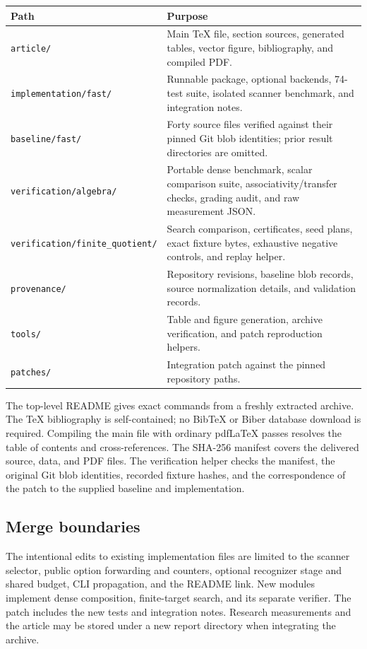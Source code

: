 \begin{center}
\small
\begin{tabular}{P{.35\linewidth}P{.57\linewidth}}
\toprule
Path & Purpose \\
\midrule
\texttt{article/} & Main TeX file, section sources, generated tables,
vector figure, bibliography, and compiled PDF. \\
\texttt{implementation/fast/} & Runnable package, optional backends,
74-test suite, isolated scanner benchmark, and integration notes. \\
\texttt{baseline/fast/} & Forty source files verified against their
pinned Git blob identities; prior result directories are omitted. \\
\texttt{verification/algebra/} & Portable dense benchmark, scalar
comparison suite, associativity/transfer checks, grading audit, and raw
measurement JSON. \\
\texttt{verification/finite\_quotient/} & Search comparison, certificates,
seed plans, exact fixture bytes, exhaustive negative controls, and replay
helper. \\
\texttt{provenance/} & Repository revisions, baseline blob records,
source normalization details, and validation records. \\
\texttt{tools/} & Table and figure generation, archive verification,
and patch reproduction helpers. \\
\texttt{patches/} & Integration patch against the pinned repository
paths. \\
\bottomrule
\end{tabular}
\end{center}

The top-level README gives exact commands from a freshly extracted
archive. The TeX bibliography is self-contained; no BibTeX or Biber
database download is required. Compiling the main file with ordinary
pdfLaTeX passes resolves the table of contents and cross-references.
The SHA-256 manifest covers the delivered source, data, and PDF files.
The verification helper checks the manifest, the original Git blob
identities, recorded fixture hashes, and the correspondence of the patch
to the supplied baseline and implementation.

\subsection{Merge boundaries}

The intentional edits to existing implementation files are limited to
the scanner selector, public option forwarding and counters, optional
recognizer stage and shared budget, CLI propagation, and the README link.
New modules implement dense composition, finite-target search, and its
separate verifier. The patch includes the new tests and integration
notes. Research measurements and the article may be stored under a new
report directory when integrating the archive.

